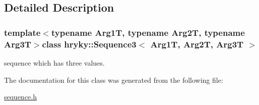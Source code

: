\subsection{Detailed Description}
\subsubsection*{template$<$typename Arg1\-T, typename Arg2\-T, typename Arg3\-T$>$class hryky\-::\-Sequence3$<$ Arg1\-T, Arg2\-T, Arg3\-T $>$}

sequence which has three values. 

The documentation for this class was generated from the following file\-:\begin{DoxyCompactItemize}
\item 
\hyperlink{sequence_8h}{sequence.\-h}\end{DoxyCompactItemize}

